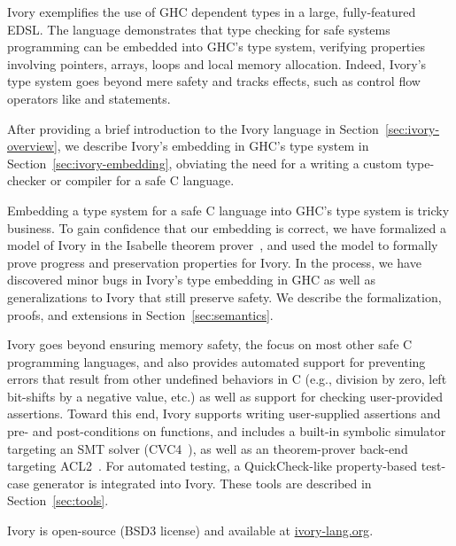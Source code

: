 Ivory exemplifies the use of GHC dependent types in a large, fully-featured
EDSL. The language demonstrates that type checking for safe systems programming
can be embedded into GHC's type system, verifying properties involving
pointers, arrays, loops and local memory allocation. Indeed, Ivory's type
system goes beyond mere safety and tracks effects, such as control flow
operators like  and  statements.

After providing a brief introduction to the Ivory language in
Section~\ref{sec:ivory-overview}, we describe Ivory's embedding in GHC's type
system in Section~\ref{sec:ivory-embedding}, obviating the need for a writing a
custom type-checker or compiler for a safe C language.

Embedding a type system for a safe C language into GHC's type system is tricky
business. To gain confidence that our embedding is correct, we have formalized a
model of Ivory in the Isabelle theorem prover~\cite{isabelle}, and used the model to
formally prove progress and preservation properties for Ivory. In the process,
we have discovered minor bugs in Ivory's type embedding in GHC as well as
generalizations to Ivory that still preserve safety. We describe the
formalization, proofs, and extensions in Section~\ref{sec:semantics}.

Ivory goes beyond ensuring memory safety, the focus on most other safe C
programming languages, and also provides automated support for preventing errors
that result from other undefined behaviors in C (e.g., division by zero, left
bit-shifts by a negative value, etc.) as well as support for checking
user-provided assertions. Toward this end, Ivory supports writing user-supplied
assertions and pre- and post-conditions on functions, and includes a built-in
symbolic simulator targeting an SMT solver (CVC4~\cite{cvc4}), as well as an
theorem-prover back-end targeting ACL2~\cite{acl2}. For automated testing, a
QuickCheck-like property-based test-case generator is integrated into
Ivory. These tools are described in Section~\ref{sec:tools}.

Ivory is open-source (BSD3 license) and available at \url{ivory-lang.org}. 
